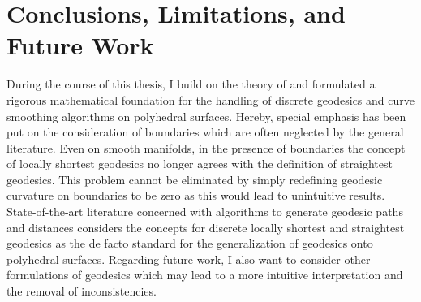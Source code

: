 \documentclass[crop=false]{stdlocal}
\begin{document}
\section{Conclusions, Limitations, and Future Work} %
\label{sec:conclusions}

  During the course of this thesis, I build on the theory of \textcite{polthier2006} and formulated a rigorous mathematical foundation for the handling of discrete geodesics and curve smoothing algorithms on polyhedral surfaces.
  Hereby, special emphasis has been put on the consideration of boundaries which are often neglected by the general literature.
  Even on smooth manifolds, in the presence of boundaries the concept of locally shortest geodesics no longer agrees with the definition of straightest geodesics.
  This problem cannot be eliminated by simply redefining geodesic curvature on boundaries to be zero as this would lead to unintuitive results.
  State-of-the-art literature concerned with algorithms to generate geodesic paths and distances considers the concepts for discrete locally shortest and straightest geodesics as the de facto standard for the generalization of geodesics onto polyhedral surfaces.
  Regarding future work, I also want to consider other formulations of geodesics which may lead to a more intuitive interpretation and the removal of inconsistencies.

\end{document}
